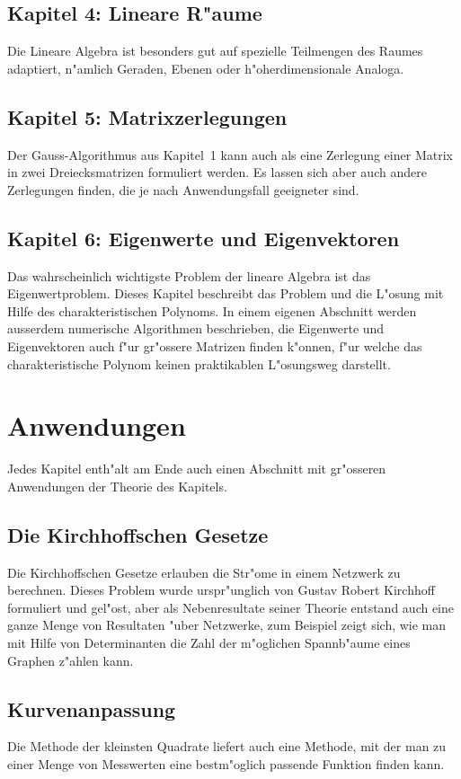 \subsection*{Kapitel 4: Lineare R"aume}
Die Lineare Algebra ist besonders gut auf spezielle
Teilmengen des Raumes adaptiert, n"amlich Geraden,
Ebenen oder h"oherdimensionale Analoga.

\subsection*{Kapitel 5: Matrixzerlegungen}
Der Gauss-Algorithmus aus Kapitel~1 kann auch als eine
Zerlegung einer Matrix in zwei Dreiecksmatrizen formuliert werden.
Es lassen sich aber auch andere Zerlegungen finden, die je
nach Anwendungsfall geeigneter sind.

\subsection*{Kapitel 6: Eigenwerte und Eigenvektoren}
Das wahrscheinlich wichtigste Problem der lineare Algebra
ist das Eigenwertproblem.
Dieses Kapitel beschreibt das Problem und die L"osung mit Hilfe
des charakteristischen Polynoms.
In einem eigenen Abschnitt werden ausserdem numerische Algorithmen
beschrieben, die Eigenwerte und Eigenvektoren auch f"ur gr"ossere
Matrizen finden k"onnen, f"ur welche das charakteristische 
Polynom keinen praktikablen L"osungsweg darstellt.

\section*{Anwendungen}
Jedes Kapitel enth"alt am Ende auch einen Abschnitt mit gr"osseren
Anwendungen der Theorie des Kapitels.

\subsection*{Die Kirchhoffschen Gesetze}
Die Kirchhoffschen Gesetze erlauben die Str"ome in einem Netzwerk
zu berechnen.
Dieses Problem wurde urspr"unglich von Gustav Robert Kirchhoff
formuliert und gel"ost, aber als Nebenresultate seiner Theorie
entstand auch eine ganze Menge von Resultaten "uber Netzwerke,
zum Beispiel zeigt sich, wie man mit Hilfe von Determinanten
die Zahl der m"oglichen Spannb"aume eines Graphen z"ahlen kann.

\subsection*{Kurvenanpassung}
Die Methode der kleinsten Quadrate liefert auch eine Methode,
mit der man zu einer Menge von Messwerten eine bestm"oglich passende
Funktion finden kann.

